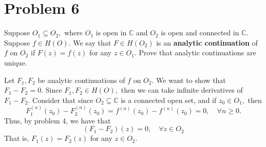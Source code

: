 \documentclass[11pt]{article}
\newcommand{\bbC}{\mathbb{C}}
\begin{document}
\section*{Problem 6}
\begin{problem}
    Suppose $O_1 \subseteq O_2,$ where $O_1$ is open in $\bbC$ and $O_2$ is open and connected in $\bbC.$ Suppose $f \in H(O).$ We say that $F \in H(O_2)$ is an \textbf{analytic continuation} of $f$ on $O_2$ if $F(z) = f(z)$ for any $z\in O_1.$ Prove that analytic continuations are unique. 
\end{problem}
\begin{solution}
    Let $F_1, F_2$ be analytic continuations of $f$ on $O_2.$ We want to show that $F_1 - F_2 = 0.$ Since $F_1, F_2 \in H(O),$ then we can take infinite derivatives of $F_1 - F_2.$ Consider that since $O_2 \subseteq \bbC$ is a connected open set, and if $z_0 \in O_1,$ then 
    \[F_1^{(n)}(z_0)- F_2^{(n)}(z_0)= f^{(n)}(z_0) - f^{(n)}(z_0) = 0, \quad \forall n \geq 0.\] Thus, by problem 4, we have that 
    \[(F_1 - F_2)(z) = 0, \quad \forall z\in O_2\] That is, $F_1(z) = F_2(z)$ for any $z\in O_2.$
\end{solution}

\newpage
\end{document}
